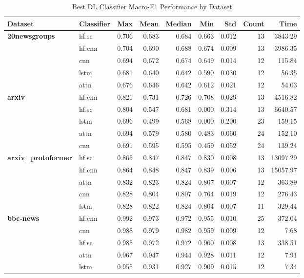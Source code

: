 \documentclass[final]{clv2025}
\begin{document}
\begin{table}[h!]
\centering
\scriptsize
\caption{Best DL Classifier Macro-F1 Performance by Dataset}
\label{tab:dl_classifier_macro_f1}
\begin{tabular}{@{}p{2cm}p{1.2cm}rrrrrrr@{}}
\toprule
\textbf{Dataset} & \textbf{Classifier} & \textbf{Max} & \textbf{Mean} & \textbf{Median} & \textbf{Min} & \textbf{Std} & \textbf{Count} & \textbf{Time} \\
\midrule
\textbf{20newsgroups} & hf.sc & 0.706 & 0.683 & 0.684 & 0.663 & 0.012 & 13 & 3843.29 \\
 & hf.cnn & 0.704 & 0.690 & 0.688 & 0.674 & 0.009 & 13 & 3986.35 \\
 & cnn & 0.694 & 0.672 & 0.674 & 0.649 & 0.014 & 12 & 115.84 \\
 & lstm & 0.681 & 0.640 & 0.642 & 0.590 & 0.030 & 12 & 56.35 \\
 & attn & 0.676 & 0.646 & 0.642 & 0.612 & 0.021 & 12 & 54.03 \\
\midrule
\textbf{arxiv} & hf.cnn & 0.821 & 0.731 & 0.726 & 0.708 & 0.029 & 13 & 4516.82 \\
 & hf.sc & 0.804 & 0.547 & 0.681 & 0.000 & 0.314 & 13 & 6640.57 \\
 & lstm & 0.696 & 0.499 & 0.568 & 0.000 & 0.200 & 23 & 159.15 \\
 & attn & 0.694 & 0.579 & 0.580 & 0.483 & 0.060 & 24 & 152.10 \\
 & cnn & 0.691 & 0.595 & 0.595 & 0.459 & 0.052 & 24 & 139.24 \\
\midrule
\textbf{arxiv\_protoformer} & hf.sc & 0.865 & 0.847 & 0.847 & 0.830 & 0.008 & 13 & 13097.29 \\
 & hf.cnn & 0.864 & 0.848 & 0.847 & 0.839 & 0.006 & 13 & 15057.97 \\
 & attn & 0.832 & 0.823 & 0.824 & 0.807 & 0.007 & 12 & 363.89 \\
 & cnn & 0.828 & 0.804 & 0.807 & 0.764 & 0.019 & 12 & 276.43 \\
 & lstm & 0.828 & 0.822 & 0.824 & 0.804 & 0.007 & 11 & 329.44 \\
\midrule
\textbf{bbc-news} & hf.cnn & 0.992 & 0.973 & 0.972 & 0.955 & 0.010 & 25 & 372.04 \\
 & cnn & 0.988 & 0.979 & 0.982 & 0.959 & 0.009 & 12 & 7.68 \\
 & hf.sc & 0.985 & 0.972 & 0.972 & 0.960 & 0.008 & 13 & 338.51 \\
 & attn & 0.967 & 0.947 & 0.944 & 0.928 & 0.011 & 12 & 7.91 \\
 & lstm & 0.955 & 0.931 & 0.927 & 0.909 & 0.015 & 12 & 7.34 \\

\end{tabular}
\end{table}
\end{document}
